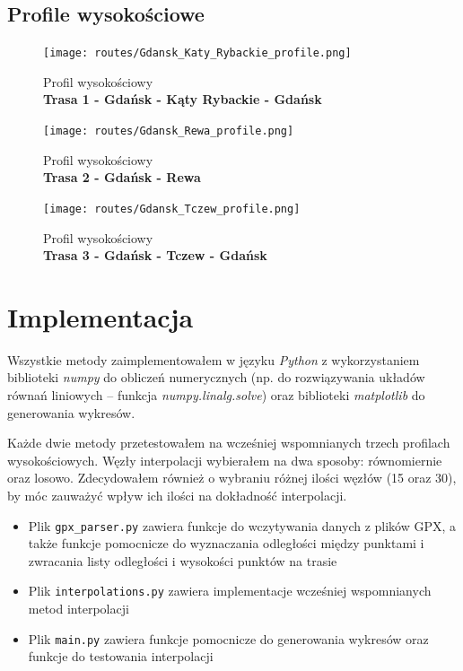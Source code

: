 \documentclass{article}
\begin{document}
\subsection{Profile wysokościowe}

\begin{figure}[H]
    \centering
    \texttt{[image: routes/Gdansk\_Katy\_Rybackie\_profile.png]}
    \caption*{Profil wysokościowy \\ \textbf{Trasa 1 - Gdańsk - Kąty Rybackie - Gdańsk}}
\end{figure}

\begin{figure}[H]
    \centering
    \texttt{[image: routes/Gdansk\_Rewa\_profile.png]}
    \caption*{Profil wysokościowy \\ \textbf{Trasa 2 - Gdańsk - Rewa}}
\end{figure}

\begin{figure}[H]
    \centering
    \texttt{[image: routes/Gdansk\_Tczew\_profile.png]}
    \caption*{Profil wysokościowy \\ \textbf{Trasa 3 - Gdańsk - Tczew - Gdańsk}}
\end{figure}

\newpage

\section{Implementacja}

Wszystkie metody zaimplementowałem w języku \textit{Python} z 
wykorzystaniem biblioteki \textit{numpy} do obliczeń numerycznych
(np. do rozwiązywania układów równań liniowych -- funkcja \textit{numpy.linalg.solve})
oraz biblioteki \textit{matplotlib}
do generowania wykresów.

Każde dwie metody przetestowałem na wcześniej wspomnianych trzech profilach wysokościowych.
Węzły interpolacji wybierałem na dwa sposoby: równomiernie oraz losowo.
Zdecydowałem również o wybraniu różnej ilości węzłów (15 oraz 30), by móc 
zauważyć wpływ ich ilości na dokładność interpolacji.

\begin{itemize}
    \item Plik \texttt{gpx\_parser.py} zawiera funkcje do wczytywania danych z plików GPX,
    a także funkcje pomocnicze do wyznaczania odległości między punktami
    i zwracania listy odległości i wysokości punktów na trasie
    \item Plik \texttt{interpolations.py} zawiera implementacje wcześniej
    wspomnianych metod interpolacji
    \item Plik \texttt{main.py} zawiera funkcje pomocnicze do generowania wykresów
    oraz funkcje do testowania interpolacji
\end{itemize}
\end{document}
